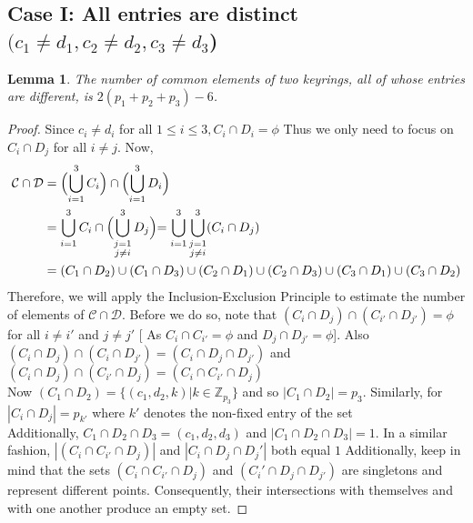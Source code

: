 \documentclass[12pt]{article}
\newtheorem{lemma}[theorem]{Lemma}
\theoremstyle{definition}
\theoremstyle{remark}
\begin{document}
\subsection{Case I: All entries are distinct $(c_1 \neq d_1, c_2 \neq d_2, c_3 \neq d_3$)}
\begin{lemma} \label{le2}
    The number of common elements of two keyrings, all of whose entries are different, is $2(p_1+p_2+p_3)- 6$.
    
\end{lemma}
\begin{proof}
    Since $c_i\neq d_i$ for all $1\leq i\leq 3, C_i\cap D_i = \phi $ Thus we only need to focus on $C_i\cap D_j$ for all $i\neq j$. Now,
    \begin{align*}
        \mathcal{C}\cap\mathcal{D}&=\Bigl(\displaystyle\bigcup_{i=1}^{3}C_i \Bigr)\cap\Bigl(\displaystyle\bigcup_{i=1}^{3}D_i\Bigl)
        \\&=\displaystyle\bigcup_{i=1}^{3}C_i\cap\Bigl(\displaystyle\bigcup_{\substack{j=1\\ j\neq i}}^{3}D_j\Bigl) =\displaystyle\bigcup_{i=1}^{3}\displaystyle\bigcup_{\substack{j=1\\ j\neq i}}^{3} (C_i\cap D_j)  \\
        &= (C_1 \cap D_2) \cup(C_1 \cap D_3) \cup(C_2 \cap D_1) \cup(C_2 \cap D_3) \cup(C_3 \cap D_1) \cup(C_3 \cap D_2)
    \end{align*}
    Therefore, we will apply the Inclusion-Exclusion Principle to estimate the number of elements of $\mathcal{C}\cap \mathcal{D}$. Before we do so, note that $(C_i\cap D_j) \cap (C_{i'}\cap D_{j'}) = \phi$ for all $i\neq i'$ and $j\neq j'$ [ As $C_i\cap C_{i'} = \phi$ and $D_j \cap D_{j'}=\phi$]. Also $(C_i\cap D_j) \cap (C_{i}\cap D_{j'})= (C_i\cap D_j\cap D_{j'})$  and  $(C_i\cap D_j) \cap (C_{i'}\cap D_{j})= (C_i\cap C_{i'}\cap D_j)$ \\Now $(C_1\cap D_2) = \{(c_1,d_2,k)| k \in \mathbb{Z}_{p_3}\}$ and so $|C_1 \cap D_2|=p_3$. Similarly, for $|C_i \cap D_j|=p_{k'}$ where $k'$ denotes the non-fixed entry of the set\\
    Additionally, $C_1 \cap D_2 \cap D_3 = (c_1, d_2, d_3)$ and $|C_1 \cap D_2 \cap D_3 |= 1$. In a similar fashion, $|(C_i \cap C_{i'} \cap D_j)|$ and $|C_i \cap D_j \cap D_j'|$ both equal $1$ Additionally, keep in mind that the sets $(C_i \cap C_{i'}\cap D_j)$ and $(C_i'\cap D_j\cap D_{j'})$ are singletons and represent different points. Consequently, their intersections with themselves and with one another produce an empty set.  


\end{proof}
\end{document}
